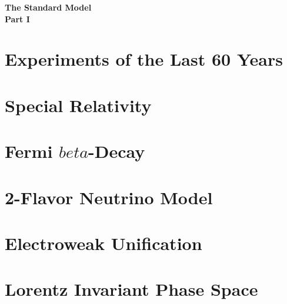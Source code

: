 \documentclass{report}
\begin{document}
  \begin{titlepage}
    \phantom{\,}
    \vfill
    \centering
    {\huge\textbf{The Standard Model}}\\
    \vspace{\parskip}
    {\Large\textbf{Part I}}
    \vspace{5em}
    \vfill
  \end{titlepage}

  \tableofcontents

    
    
    
    
    
    
    
    
    
    
    
    
    
    

    \appendix
    \chapter{Experiments of the Last 60 Years}
    

    \chapter{Special Relativity}
    

    \chapter{Fermi $beta$-Decay}
    

    \chapter{2-Flavor Neutrino Model}
    

    \chapter{Electroweak Unification}
    

    \chapter{Lorentz Invariant Phase Space}
    
\end{document}
